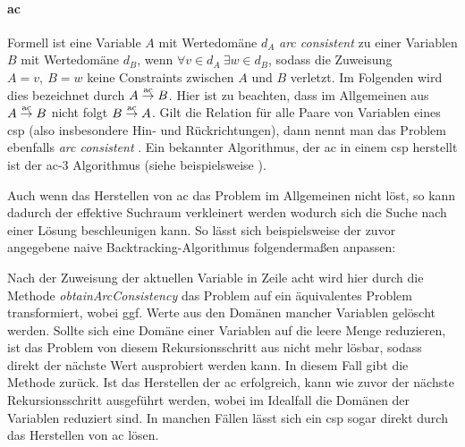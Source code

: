 \paragraph{\acl*{ac}} Formell ist eine Variable $A$ mit Wertedomäne $d_A$ \textit{arc consistent} zu einer Variablen $B$ mit Wertedomäne $d_B$, wenn $\forall v \in d_A \ 
\exists w \in d_B$, sodass die Zuweisung $A = v, \ B = w$ keine Constraints zwischen $A$ und $B$ verletzt. Im Folgenden wird dies bezeichnet durch $A \stackrel{\text{ac}}{\rightarrow} B$. Hier ist
zu beachten, dass im Allgemeinen aus $A \stackrel{\text{ac}}{\rightarrow} B$ nicht folgt $B \stackrel{\text{ac}}{\rightarrow} A$. Gilt die Relation für alle Paare von Variablen eines \ac*{csp} (also insbesondere Hin- und 
Rückrichtungen), dann nennt man das Problem ebenfalls \textit{arc consistent} \cite{ACOverview}. Ein bekannter Algorithmus, der \ac*{ac} in einem \ac*{csp} herstellt ist 
der \ac*{ac}-3 Algorithmus (siehe beispielsweise \cite{ac3}). 

Auch wenn das Herstellen von \ac*{ac} das Problem im
Allgemeinen nicht löst, so kann dadurch der effektive Suchraum verkleinert werden wodurch sich die Suche nach einer Lösung beschleunigen kann. So lässt sich beispielsweise der
zuvor angegebene naive Backtracking-Algorithmus folgendermaßen anpassen:

Nach der Zuweisung der aktuellen Variable in Zeile acht wird hier durch die Methode \textit{obtainArcConsistency} das Problem auf ein äquivalentes Problem transformiert, wobei
ggf. Werte aus den Domänen mancher Variablen gelöscht werden. Sollte sich eine Domäne einer Variablen auf die leere Menge reduzieren, ist das Problem von diesem Rekursionsschritt
aus nicht mehr lösbar, sodass direkt der nächste Wert ausprobiert werden kann. In diesem Fall gibt die Methode \inlcode{false} zurück. Ist das Herstellen der \ac*{ac} erfolgreich,
kann wie zuvor der nächste Rekursionsschritt ausgeführt werden, wobei im Idealfall die Domänen der Variablen reduziert sind. In manchen Fällen lässt sich ein \ac*{csp} sogar
direkt durch das Herstellen von \ac*{ac} lösen.